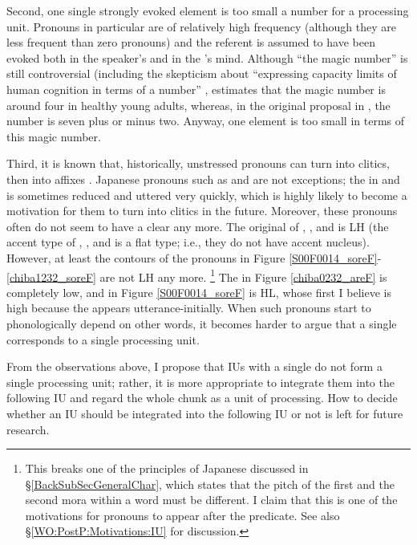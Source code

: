 Second, one single strongly evoked element is too small a number for a processing unit.
Pronouns in particular are of relatively high frequency (although they are less frequent than zero pronouns) and the referent is assumed to have been evoked both in the speaker's and in the 's mind.
Although ``the magic number'' is still controversial (including the skepticism about ``expressing capacity limits of human cognition in terms of a number'' \cite[][p.~245]{oberauer07},
 estimates that the magic number is around four in healthy young adults,
whereas, in the original proposal in ,
the number is seven plus or minus two.
Anyway, one element is too small in terms of this magic number.



Third,
it is known that, historically, unstressed pronouns can turn into clitics, then into affixes \cite{givon76}.
Japanese pronouns such as  and  are not exceptions;
the  in  and  is sometimes reduced and uttered very quickly,
which is highly likely to become a motivation for them to turn into clitics in the future.
Moreover, these pronouns often do not seem to have a clear  any more.
The original  of , , and  is LH
(the accent type of , , and  is a flat type;
i.e., they do not have accent nucleus).
However, at least the  contours of the pronouns in Figure \ref{S00F0014_soreF}-\ref{chiba1232_soreF} are not LH any more.%
	\footnote{
	This breaks one of the  principles of Japanese discussed in \S \ref{BackSubSecGeneralChar},
	which states that the pitch of the first and the second mora within a word must be different.
	I claim that this is one of the motivations for pronouns to appear after the predicate.
	See also \S \ref{WO:PostP:Motivations:IU} for discussion.
	}
The   in Figure \ref{chiba0232_areF} is completely low,
and  in Figure \ref{S00F0014_soreF} is HL, whose first  I believe is high because the  appears utterance-initially.
When such  pronouns start to phonologically depend on other words,
it becomes harder to argue that a single  corresponds to a single processing unit.

From the observations above,
I propose that IUs with a single  do not form a single processing unit;
rather, it is more appropriate to integrate them into the following IU and regard the whole chunk as a unit of processing.
How to decide whether an IU should be integrated into the following IU or not is left for future research.


